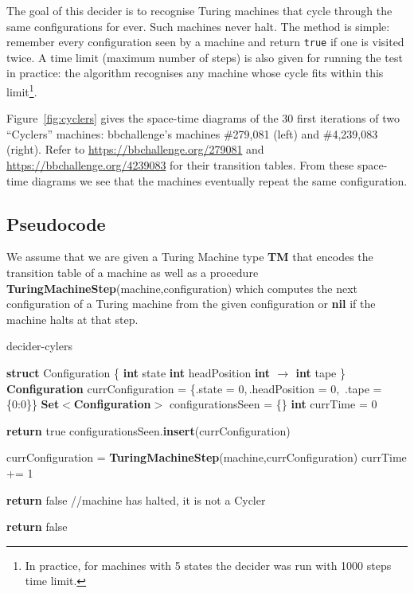 The goal of this decider is to recognise Turing machines that cycle through the same configurations for ever. Such machines never halt. The method is simple: remember every configuration seen by a machine and return \texttt{true} if one is visited twice. A time limit (maximum number of steps) is also given for running the test in practice: the algorithm recognises any machine whose cycle fits within this limit\footnote{In practice, for machines with 5 states the decider was run with 1000 steps time limit.}.


\begin{example}\normalfont
  Figure~\ref{fig:cyclers} gives the space-time diagrams of the 30 first iterations of two ``Cyclers'' machines: bbchallenge's machines \#279,081 (left) and \#4,239,083 (right). Refer to \url{https://bbchallenge.org/279081} and
  \url{https://bbchallenge.org/4239083} for their transition tables. From these space-time diagrams we see that the machines eventually repeat the same configuration.
\end{example}

\newpage
\subsection{Pseudocode}

We assume that we are given a Turing Machine type \textbf{TM} that encodes the transition table of a machine as well as a procedure \textbf{TuringMachineStep}(machine,configuration) which computes the next configuration of a Turing machine from the given configuration or \textbf{nil} if the machine halts at that step.

\begin{algorithm}
  \caption{{\sc decider-cylers}}\label{alg:cyclers}

  \begin{algorithmic}[1]

    \State \textbf{struct} Configuration \{
    \State \tabi\textbf{int} state
    \State \tabi\textbf{int} headPosition
    \State \tabi\textbf{int $\boldsymbol{\to}$ int} tape
    \State \}
    \State
    \State \textbf{Configuration} currConfiguration = \{.state = 0,$\,$.headPosition = 0,$\,$ .tape = \{0:0\}\}
    \State \textbf{Set$\boldsymbol{<}$Configuration$\boldsymbol{>}$} configurationsSeen = \{\}
    \State \textbf{int} currTime = 0

    \State \textbf{return} true
    \EndIf
    \State configurationsSeen.\textbf{insert}(currConfiguration)

    \State currConfiguration = \textbf{TuringMachineStep}(machine,currConfiguration)
    \State currTime += 1


    \State \textbf{return} false //machine has halted, it is not a Cycler
    \EndIf
    \EndWhile

    \State \textbf{return} false
    \EndProcedure

  \end{algorithmic}
\end{algorithm}

